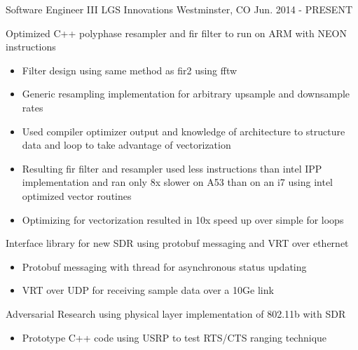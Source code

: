 

\begin{cventries}

  \cventry
    {Software Engineer III} %
    {LGS Innovations} %
    {Westminster, CO} %
    {Jun. 2014 - PRESENT} %
    {
      \begin{cvitems} %
        \item {Optimized C++ polyphase resampler and fir filter to run on ARM with NEON instructions}
        \begin{itemize}
          \item {Filter design using same method as fir2 using fftw}
          \item {Generic resampling implementation for arbitrary upsample and downsample rates}
          \item {Used compiler optimizer output and knowledge of architecture to structure data and loop to take advantage of vectorization}
          \item {Resulting fir filter and resampler used less instructions than intel IPP implementation and ran only 8x slower on A53 than on an i7 using intel optimized vector routines}
          \item {Optimizing for vectorization resulted in 10x speed up over simple for loops}
        \end{itemize}
        \item {Interface library for new SDR using protobuf messaging and VRT over ethernet}
        \begin{itemize}
          \item {Protobuf messaging with thread for asynchronous status updating}
          \item {VRT over UDP for receiving sample data over a 10Ge link}
        \end{itemize}
        \item {Adversarial Research using physical layer implementation of 802.11b with SDR}
        \begin{itemize}
          \item {Prototype C++ code using USRP to test RTS/CTS ranging technique}

\end{itemize}
\end{cvitems}}
\end{cventries}
